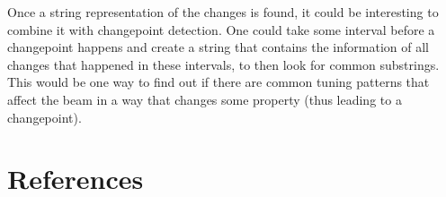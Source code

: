 \documentclass[12pt,a4paper]{article}
\begin{document}
Once a string representation of the changes is found, it could be interesting to combine it with changepoint detection. One could take some interval before a changepoint happens and create a string that contains the information of all changes that happened in these intervals, to then look for common substrings. This would be one way to find out if there are common tuning patterns that affect the beam in a way that changes some property (thus leading to a changepoint).

\hypertarget{references}{%
\section*{References}\label{references}}

\hypertarget{refs}{}
\printbibliography
\end{document}
